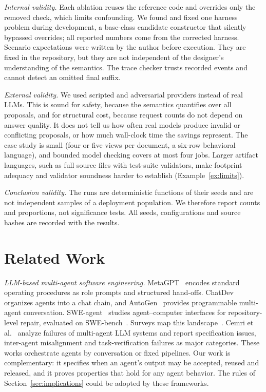 \documentclass[10pt,journal,compsoc]{IEEEtran}
\theoremstyle{plain}
\theoremstyle{definition}
\begin{document}
\emph{Internal validity.} Each ablation reuses the reference code and overrides only the removed check, which limits confounding. We found and fixed one harness problem during development, a base-class candidate constructor that silently bypassed overrides; all reported numbers come from the corrected harness. Scenario expectations were written by the author before execution. They are fixed in the repository, but they are not independent of the designer's understanding of the semantics. The trace checker trusts recorded events and cannot detect an omitted final suffix.

\emph{External validity.} We used scripted and adversarial providers instead of real LLMs. This is sound for safety, because the semantics quantifies over all proposals, and for structural cost, because request counts do not depend on answer quality. It does not tell us how often real models produce invalid or conflicting proposals, or how much wall-clock time the savings represent. The case study is small (four or five views per document, a six-row behavioral language), and bounded model checking covers at most four jobs. Larger artifact languages, such as full source files with test-suite validators, make footprint adequacy and validator soundness harder to establish (Example~\ref{ex:limits}).

\emph{Conclusion validity.} The runs are deterministic functions of their seeds and are not independent samples of a deployment population. We therefore report counts and proportions, not significance tests. All seeds, configurations and source hashes are recorded with the results.

\section{Related Work}\label{sec:related}
\emph{LLM-based multi-agent software engineering.} MetaGPT~\cite{metagpt} encodes standard operating procedures as role prompts and structured hand-offs. ChatDev~\cite{chatdev} organizes agents into a chat chain, and AutoGen~\cite{autogen} provides programmable multi-agent conversation. SWE-agent~\cite{sweagent} studies agent--computer interfaces for repository-level repair, evaluated on SWE-bench~\cite{swebench}. Surveys map this landscape~\cite{hou2024llm4se,he2025mas,wang2024agents}. Cemri et al.~\cite{cemri2025mast} analyze failures of multi-agent LLM systems and report specification issues, inter-agent misalignment and task-verification failures as major categories. These works orchestrate agents by conversation or fixed pipelines. Our work is complementary: it specifies when an agent's output may be accepted, reused and released, and it proves properties that hold for any agent behavior. The rules of Section~\ref{sec:implications} could be adopted by these frameworks.
\end{document}
